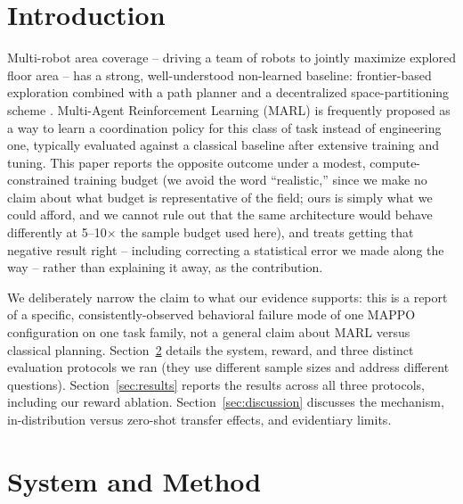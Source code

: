 \documentclass[11pt]{article}
\begin{document}
\section{Introduction}
Multi-robot area coverage -- driving a team of robots to jointly maximize
explored floor area -- has a strong, well-understood non-learned baseline:
frontier-based exploration \cite{yamauchi1997frontier, burgard2005coordinated}
combined with a path planner and a decentralized space-partitioning scheme
\cite{amigoni2017multirobot}. Multi-Agent Reinforcement Learning (MARL)
\cite{lowe2017maddpg, yu2022mappo} is frequently proposed as a way to learn a
coordination policy for this class of task instead of engineering one,
typically evaluated against a classical baseline after extensive training and
tuning. This paper reports the opposite outcome under a modest,
compute-constrained training budget (we avoid the word ``realistic,'' since
we make no claim about what budget is representative of the field; ours is
simply what we could afford, and we cannot rule out that the same
architecture would behave differently at 5--10$\times$ the sample budget used
here), and treats getting that negative result right -- including correcting a
statistical error we made along the way \cite{henderson2018deep} -- rather
than explaining it away, as the contribution.

We deliberately narrow the claim to what our evidence supports: this is a
report of a specific, consistently-observed behavioral failure mode of
one MAPPO configuration on one task family, not a general claim about MARL versus
classical planning. Section~\ref{sec:method} details the system, reward,
and three distinct evaluation protocols we ran (they use different sample
sizes and address different questions). Section~\ref{sec:results} reports
the results across all three protocols, including our reward ablation.
Section~\ref{sec:discussion} discusses the mechanism, in-distribution
versus zero-shot transfer effects, and evidentiary limits.

\section{System and Method}
\label{sec:method}
\end{document}
